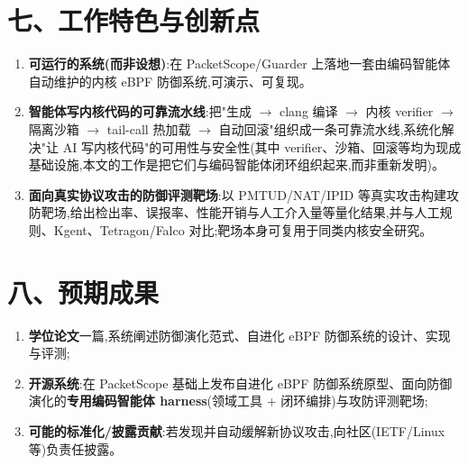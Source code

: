 \section*{七、工作特色与创新点}
\begin{enumerate}[leftmargin=2em,itemsep=1pt,topsep=2pt]
  \item \textbf{可运行的系统(而非设想)}:在 PacketScope/Guarder 上落地一套由编码智能体自动维护的内核 eBPF 防御系统,可演示、可复现。
  \item \textbf{智能体写内核代码的可靠流水线}:把"生成 $\to$ clang 编译 $\to$ 内核 verifier $\to$ 隔离沙箱 $\to$ tail-call 热加载 $\to$ 自动回滚"组织成一条可靠流水线,系统化解决"让 AI 写内核代码"的可用性与安全性(其中 verifier、沙箱、回滚等均为现成基础设施,本文的工作是把它们与编码智能体闭环组织起来,而非重新发明)。
  \item \textbf{面向真实协议攻击的防御评测靶场}:以 PMTUD/NAT/IPID 等真实攻击构建攻防靶场,给出检出率、误报率、性能开销与人工介入量等量化结果,并与人工规则、Kgent\supercite{yang2024kgent}、Tetragon\supercite{tetragon2022}/Falco\supercite{falco2018} 对比;靶场本身可复用于同类内核安全研究。
\end{enumerate}
\section*{八、预期成果}
\begin{enumerate}[leftmargin=2em,itemsep=1pt,topsep=2pt]
  \item \textbf{学位论文}一篇,系统阐述防御演化范式、自进化 eBPF 防御系统的设计、实现与评测;
  \item \textbf{开源系统}:在 PacketScope 基础上发布自进化 eBPF 防御系统原型、面向防御演化的\textbf{专用编码智能体 harness}(领域工具 + 闭环编排)与攻防评测靶场;
  \item \textbf{可能的标准化/披露贡献}:若发现并自动缓解新协议攻击,向社区(IETF/Linux 等)负责任披露。
\end{enumerate}

